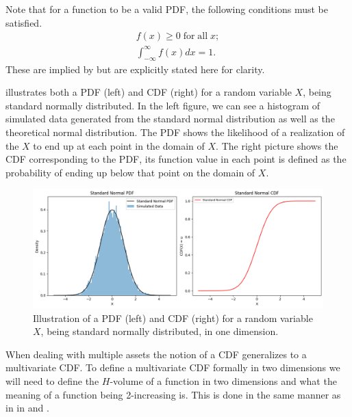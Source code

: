 \begin{remark}\label{rem:pdfProperties}
    Note that for a function to be a valid \gls{PDF}, the following conditions must be satisfied. 
    \begin{align*}
        f(x) \geq 0 \; \mathrm{ for\; all \;} x;\\
        \int_{-\infty}^{\infty}f(x)dx = 1. 
    \end{align*}
    These are implied by  but are explicitly stated here for clarity. 
\end{remark}


 illustrates both a \gls{PDF} (left) and \gls{CDF} (right) for a random variable $X$, being standard normally distributed. In the left figure, we can see a histogram of simulated data generated from the standard normal distribution as well as the theoretical normal distribution. The \gls{PDF} shows the likelihood of a realization of the $X$ to end up at each point in the domain of $X$. The right picture shows the \gls{CDF} corresponding to the \gls{PDF}, its function value in each point is defined as the probability of ending up below that point on the domain of $X$.

\begin{figure}
    \centering
    \includegraphics[width=1\linewidth]{3Theory/pictures/CDFandPDF1D.png}
    \caption{Illustration of a \gls{PDF} (left) and \gls{CDF} (right) for a random variable $X$, being standard normally distributed, in one dimension.}
    \label{fig:PDFandCDF1D}
\end{figure}

When dealing with multiple assets the notion of a \gls{CDF} generalizes to a multivariate \gls{CDF}. To define a multivariate \gls{CDF} formally in two dimensions we will need to define the $H$-volume of a function in two dimensions and what the meaning of a function being 2-increasing is. This is done in the same manner as in \citet[p.~8]{Nelsen2006} in  and .

